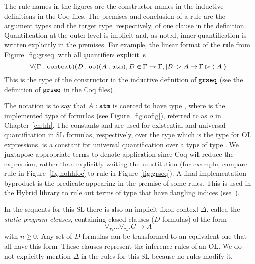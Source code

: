 The rule names in the figures are the constructor names in the inductive definitions in the Coq files. The premises and conclusion of a rule are the argument types and the target type, respectively, of one clause in the definition. Quantification at the outer level is implicit and, as noted, inner quantification is written explicitly in the premises. For example, the linear format of the \rlnmsinit{} rule from Figure~\ref{fig:grseq} with all quantifiers explicit is
$$
\forall (\Gamma : \sltm{context}) (D : \sltm{oo}) (A :\sltm{atm}),D \in \Gamma \rightarrow \bchsl[\Gamma]{D}{A} \rightarrow \seqsl[\Gamma]{\atom{A}}
$$
This is the type of the \rlnmsinit{} constructor in the inductive definition of $\sltm{grseq}$ (see the definition of $\sltm{grseq}$ in the Coq files).

The notation  is to say that $A : \coqtm{atm}$ is coerced to have type , where  is the implemented type of formulas (see Figure~\ref{fig:oofig}), referred to as $o$ in Chapter~\ref{ch:hh}. The constants  and  are used for existential and universal quantification in SL formulas, respectively, over the type  which is the type for OL expressions.  is a constant for universal quantification over a type  of type . We juxtapose appropriate terms to denote application since Coq will reduce the expression, rather than explicitly writing the substitution (for example, compare rule  in Figure~\ref{fig:hohhfoc} to rule \rlnmsalls{} in Figure~\ref{fig:grseq}). A final implementation byproduct is the predicate  appearing in the premise of some rules. This is used in the Hybrid library to rule out terms of type  that have dangling indices (see~\cite{FeltyMomigliano:JAR10}).

In the sequents for this SL there is also an implicit fixed context $\Delta$, called the \emph{static program clauses}, containing closed clauses ($D$-formulas) of the form
$$
\forall_{\tau_1}\ldots\forall_{\tau_n}.G\longrightarrow A
$$
with $n\ge0$. Any set of $D$-formulas can be transformed to an equivalent one that all have this form. These clauses represent the inference rules of an OL. We do not explicitly mention $\Delta$ in the rules for this SL because no rules modify it.


